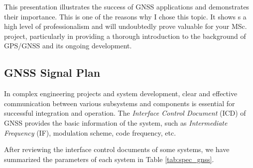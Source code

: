 This presentation illustrates the success of GNSS applications and demonstrates their importance. This is one of the reasons why I chose this topic. It shows s a high level of professionalism and will undoubtedly prove valuable for your MSc. project, particularly in providing a thorough introduction to the background of GPS/GNSS and its ongoing development.

\subsection{GNSS Signal Plan}
In complex engineering projects and system development, clear and effective communication between various subsystems and components is essential for successful integration and operation. The \textit{Interface Control Document} (ICD) of GNSS provides the basic information of the system, such as \textit{Intermediate Frequency} (IF), modulation scheme, code frequency, etc. 

After reviewing the interface control documents \cite{RN170, RN171, RN172, RN174, RN173, RN175} of some systems, we have summarized the parameters of each system in Table \ref{tab:spec_gnss}. 

